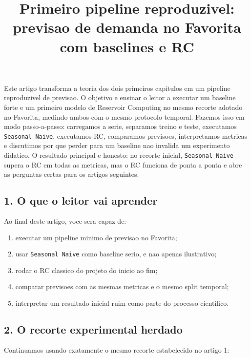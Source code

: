 \documentclass[12pt]{article}
\title{Primeiro pipeline reproduzivel: previsao de demanda no Favorita com baselines e RC}
\author{}
\providecommand{\tightlist}{%
          \setlength{\itemsep}{0pt}\setlength{\parskip}{0pt}}
\begin{document}
        \maketitle

        \begin{resumo}
        Este artigo transforma a teoria dos dois primeiros capitulos em um pipeline reproduzivel de previsao. O objetivo e ensinar o leitor a executar um baseline forte e um primeiro modelo de Reservoir Computing no mesmo recorte adotado no Favorita, medindo ambos com o mesmo protocolo temporal. Fazemos isso em modo passo-a-passo: carregamos a serie, separamos treino e teste, executamos \texttt{Seasonal\ Naive}, executamos RC, comparamos previsoes, interpretamos metricas e discutimos por que perder para um baseline nao invalida um experimento didatico. O resultado principal e honesto: no recorte inicial, \texttt{Seasonal\ Naive} supera o RC em todas as metricas, mas o RC funciona de ponta a ponta e abre as perguntas certas para os artigos seguintes.
        \end{resumo}

        \subsection{1. O que o leitor vai aprender}\label{1-o-que-o-leitor-vai-aprender}

Ao final deste artigo, voce sera capaz de:

\begin{enumerate}
\def\labelenumi{\arabic{enumi}.}
\tightlist
\item
  executar um pipeline minimo de previsao no Favorita;
\item
  usar \texttt{Seasonal\ Naive} como baseline serio, e nao apenas ilustrativo;
\item
  rodar o RC classico do projeto do inicio ao fim;
\item
  comparar previsoes com as mesmas metricas e o mesmo split temporal;
\item
  interpretar um resultado inicial ruim como parte do processo cientifico.
\end{enumerate}

\subsection{2. O recorte experimental herdado}\label{2-o-recorte-experimental-herdado}

Continuamos usando exatamente o mesmo recorte estabelecido no artigo 1:
\end{document}
